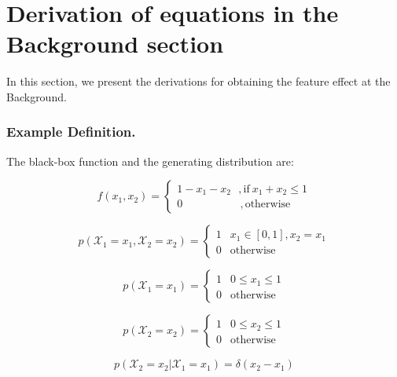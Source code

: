 \documentclass[wcp]{jmlr}
\begin{document}
\begin{itemize}
\end{itemize}

\section{Derivation of equations in the Background section}

In this section, we present the derivations for obtaining the feature
effect at the Background.


\subsubsection*{Example Definition.}The black-box function and the
generating distribution are:

\begin{equation}
  \label{eq:black-box}
  f(x_1, x_2) =
  \begin{cases}
    1 - x_1 - x_2 \: \: \:  ,\text{if} \: x_1 + x_2  \leq 1 \\
    0 \quad \quad \quad \quad \quad \:, \text{otherwise}
  \end{cases}
\end{equation}

\begin{equation}
  \label{eq:generative}
  p(\mathcal{X}_1 = x_1, \mathcal{X}_2=x_2) =
  \begin{cases}
    1 & x_1 \in [0,1], x_2=x_1 \\
    0 & \text{otherwise}
  \end{cases}
\end{equation}

\begin{equation}
  \label{eq:marginal}
  p(\mathcal{X}_1 = x_1) =
  \begin{cases}
    1 & 0 \leq x_1 \leq 1 \\
    0 & \text{otherwise}
  \end{cases}
\end{equation}

\begin{equation}
  \label{eq:marginal}
  p(\mathcal{X}_2 = x_2) =
  \begin{cases}
    1 & 0 \leq x_2 \leq 1 \\
    0 & \text{otherwise}
  \end{cases}
\end{equation}

\begin{equation}
  \label{eq:marginal}
  p(\mathcal{X}_2 = x_2|\mathcal{X}_1 = x_1) = \delta(x_2-x_1)
\end{equation}
\end{document}
